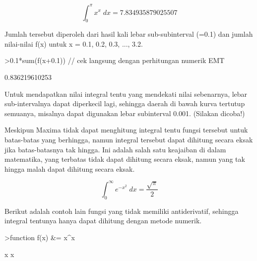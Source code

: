 \documentclass[a4paper,10pt]{article}
\begin{document}
\begin{eulernotebook}
\begin{eulercomment}
\begin{eulercomment}
\begin{eulercomment}
\begin{eulercomment}
\begin{eulercomment}
\begin{eulercomment}
\begin{eulercomment}
\begin{eulercomment}
\begin{eulercomment}
\end{eulercomment}
\begin{eulerformula}
\[
\int_{0}^{\pi}{x^{x}\;dx}=7.834935879025507
\]
\end{eulerformula}
\begin{eulercomment}
Jumlah tersebut diperoleh dari hasil kali lebar sub-subinterval (=0.1)
dan jumlah nilai-nilai f(x) untuk x = 0.1, 0.2, 0.3, ..., 3.2.
\end{eulercomment}
\begin{eulerprompt}
>0.1*sum(f(x+0.1)) // cek langsung dengan perhitungan numerik EMT
\end{eulerprompt}
\begin{euleroutput}
  0.836219610253
\end{euleroutput}
\begin{eulercomment}
Untuk mendapatkan nilai integral tentu yang mendekati nilai sebenarnya, lebar
sub-intervalnya dapat diperkecil lagi, sehingga daerah di bawah kurva tertutup
semuanya, misalnya dapat digunakan lebar subinterval 0.001. (Silakan dicoba!)

Meskipun Maxima tidak dapat menghitung integral tentu fungsi tersebut untuk
batas-batas yang berhingga, namun integral tersebut dapat dihitung secara eksak jika
batas-batasnya tak hingga. Ini adalah salah satu keajaiban di dalam matematika, yang
terbatas tidak dapat dihitung secara eksak, namun yang tak hingga malah dapat
dihitung secara eksak.
\end{eulercomment}
\begin{eulerformula}
\[
\int_{0}^{\infty }{e^ {- x^2 }\;dx}=\frac{\sqrt{\pi}}{2}
\]
\end{eulerformula}
\begin{eulercomment}
Berikut adalah contoh lain fungsi yang tidak memiliki antiderivatif, sehingga
integral tentunya hanya dapat dihitung dengan metode numerik.
\end{eulercomment}
\begin{eulerprompt}
>function f(x) &= x^x
\end{eulerprompt}
\begin{euleroutput}
  
                                     x
                                    x
  

\end{euleroutput}
\end{eulercomment}
\end{eulercomment}
\end{eulercomment}
\end{eulercomment}
\end{eulercomment}
\end{eulercomment}
\end{eulercomment}
\end{eulercomment}
\end{eulernotebook}
\end{document}
